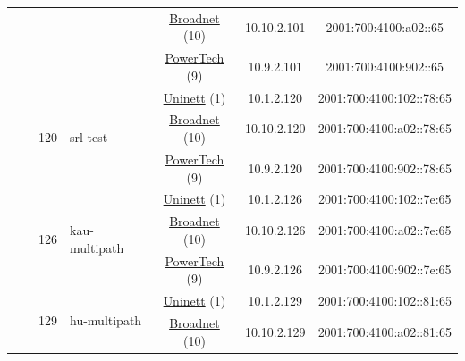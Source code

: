 \begin{small}
\begin{center}
\begin{longtable}{|c|c|c|c|c|c|c|c|}
  &  & \multicolumn{2}{|c|}{} & \multicolumn{2}{|c|}{\tiny{\href{https://www.broadnet.no}{Broadnet} (10)}} & \tiny{10.10.2.101} & \tiny{2001:700:4100:a02::65} \\* \cline{5-5}\cline{6-6}\cline{7-7}\cline{8-8}
  &  & \multicolumn{2}{|c|}{} & \multicolumn{2}{|c|}{\tiny{\href{http://www.powertech.no}{PowerTech} (9)}} & \tiny{10.9.2.101} & \tiny{2001:700:4100:902::65} \\* \cline{3-3}\cline{4-4}\cline{5-5}\cline{6-6}\cline{7-7}\cline{8-8}
  &  & \multirow{3}{*}{\tiny{120}} & \multicolumn{1}{|l|}{\multirow{3}{*}{\tiny{srl-test}}} & \multicolumn{2}{|c|}{\tiny{\href{https://www.uninett.no}{Uninett} (1)}} & \tiny{10.1.2.120} & \tiny{2001:700:4100:102::78:65} \\* \cline{5-5}\cline{6-6}\cline{7-7}\cline{8-8}
  &  &  &  & \multicolumn{2}{|c|}{\tiny{\href{https://www.broadnet.no}{Broadnet} (10)}} & \tiny{10.10.2.120} & \tiny{2001:700:4100:a02::78:65} \\* \cline{5-5}\cline{6-6}\cline{7-7}\cline{8-8}
  &  &  &  & \multicolumn{2}{|c|}{\tiny{\href{http://www.powertech.no}{PowerTech} (9)}} & \tiny{10.9.2.120} & \tiny{2001:700:4100:902::78:65} \\* \cline{3-3}\cline{4-4}\cline{5-5}\cline{6-6}\cline{7-7}\cline{8-8}
  &  & \multirow{3}{*}{\tiny{126}} & \multicolumn{1}{|l|}{\multirow{3}{*}{\tiny{kau-multipath}}} & \multicolumn{2}{|c|}{\tiny{\href{https://www.uninett.no}{Uninett} (1)}} & \tiny{10.1.2.126} & \tiny{2001:700:4100:102::7e:65} \\* \cline{5-5}\cline{6-6}\cline{7-7}\cline{8-8}
  &  &  &  & \multicolumn{2}{|c|}{\tiny{\href{https://www.broadnet.no}{Broadnet} (10)}} & \tiny{10.10.2.126} & \tiny{2001:700:4100:a02::7e:65} \\* \cline{5-5}\cline{6-6}\cline{7-7}\cline{8-8}
  &  &  &  & \multicolumn{2}{|c|}{\tiny{\href{http://www.powertech.no}{PowerTech} (9)}} & \tiny{10.9.2.126} & \tiny{2001:700:4100:902::7e:65} \\* \cline{3-3}\cline{4-4}\cline{5-5}\cline{6-6}\cline{7-7}\cline{8-8}
  &  & \multirow{3}{*}{\tiny{129}} & \multicolumn{1}{|l|}{\multirow{3}{*}{\tiny{hu-multipath}}} & \multicolumn{2}{|c|}{\tiny{\href{https://www.uninett.no}{Uninett} (1)}} & \tiny{10.1.2.129} & \tiny{2001:700:4100:102::81:65} \\* \cline{5-5}\cline{6-6}\cline{7-7}\cline{8-8}
  &  &  &  & \multicolumn{2}{|c|}{\tiny{\href{https://www.broadnet.no}{Broadnet} (10)}} & \tiny{10.10.2.129} & \tiny{2001:700:4100:a02::81:65} \\* \cline{5-5}\cline{6-6}\cline{7-7}\cline{8-8}

\end{longtable}
\end{center}
\end{small}
